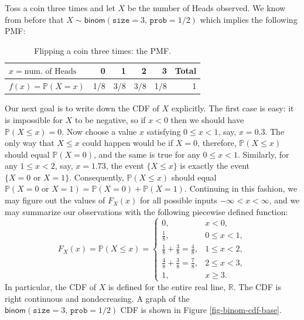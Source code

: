 \documentclass[captions=tableheading]{scrbook}
\begin{document}
\begin{example}
Toss a coin three times and let \(X\) be the number of Heads observed. We know from before that \(X\sim\mathsf{binom}(\mathtt{size}=3,\,\mathtt{prob}=1/2)\) which implies the following PMF:

\begin{table}[htb]
\caption[Flipping a coin thrice: PMF]{Flipping a coin three times: the PMF.} \label{tab-flip-coin-thrice}
\begin{center}
\begin{tabular}{lrrrrr}
 \(x=\mbox{num. of Heads}\)    &    0  &    1  &    2  &    3  &  Total  \\
\hline
 \(f(x) = \mathbb{P}(X = x)\)  &  1/8  &  3/8  &  3/8  &  1/8  &      1  \\
\end{tabular}
\end{center}
\end{table}


Our next goal is to write down the CDF of \(X\) explicitly. The first case is easy: it is impossible for \(X\) to be negative, so if \(x<0\) then we should have \(\mathbb{P}(X\leq x)=0\). Now choose a value \(x\) satisfying \(0\leq x<1\), say, \(x=0.3\). The only way that \(X\leq x\) could happen would be if \(X=0\), therefore, \(\mathbb{P}(X\leq x)\) should equal \(\mathbb{P}(X=0)\), and the same is true for any \(0\leq x<1\). Similarly, for any \(1\leq x<2\), say, \(x=1.73\), the event \(\{ X\leq x \}\) is exactly the event \(\{ X=0\mbox{ or }X=1 \}\). Consequently, \(\mathbb{P}(X\leq x)\) should equal \(\mathbb{P}(X=0\mbox{ or }X=1)=\mathbb{P}(X=0)+\mathbb{P}(X=1)\). Continuing in this fashion, we may figure out the values of \(F_{X}(x)\) for all possible inputs \(-\infty<x<\infty\), and we may summarize our observations with the following piecewise defined function:
\[
F_{X}(x)=\mathbb{P}(X\leq x)=
\begin{cases}
0, & x<0,\\
\frac{1}{8}, & 0\leq x<1,\\
\frac{1}{8}+\frac{3}{8}=\frac{4}{8}, & 1\leq x<2,\\
\frac{4}{8}+\frac{3}{8}=\frac{7}{8}, & 2\leq x<3,\\
1, & x\geq3.
\end{cases}
\]
In particular, the CDF of \(X\) is defined for the entire real line, \(\mathbb{R}\). The CDF is right continuous and nondecreasing. A graph of the \(\mathsf{binom}(\mathtt{size}=3,\,\mathtt{prob}=1/2)\) CDF is shown in Figure \ref{fig-binom-cdf-base}.
\end{example}
\end{document}
